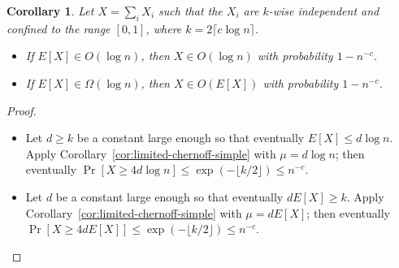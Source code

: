 \documentclass{article}
\newtheorem{corollary}[theorem]{Corollary}
\begin{document}
\begin{tcolorbox}
  \begin{corollary}
    Let \(X = \sum_i X_i\) such that the \(X_i\) are \(k\)-wise independent and confined to the range \([0, 1]\), where \(k = 2\lceil c\log n \rceil\).
    \begin{itemize}
    \item If \(E[X] \in O(\log n)\), then  \(X \in O(\log n)\) with probability \(1 - n^{-c}\).
    \item If \(E[X] \in \Omega(\log n)\), then \(X \in O(E[X])\) with probability \(1 - n^{-c}\).
    \end{itemize}
  \end{corollary}
\end{tcolorbox}
\begin{proof}\hfill
  \begin{itemize}
  \item
    Let \(d \ge k\) be a constant large enough so that eventually \(E[X] \le d \log n\).
    Apply Corollary~\ref{cor:limited-chernoff-simple} with \(\mu = d \log n\); 
    then eventually \(\Pr[X \ge 4d \log n] \le \exp(-\lfloor k/2 \rfloor) \le n^{-c}\).
  \item
    Let \(d\) be a constant large enough so that eventually \(d E[X] \ge k\).
    Apply Corollary~\ref{cor:limited-chernoff-simple} with \(\mu = dE[X]\);
    then eventually \(\Pr[X \ge 4dE[X]] \le \exp(-\lfloor k/2 \rfloor) \le n^{-c}\).
  \end{itemize}
\end{proof}

\end{document}
